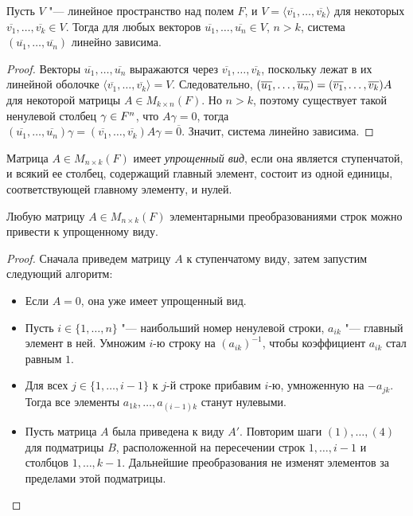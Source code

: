     \begin{theorem}
    	Пусть $V$ "--- линейное пространство над полем $F$, и $V = \langle\overline{v_1}, \dots, \overline{v_k}\rangle$ для некоторых $\overline{v_1}, \dotsc, \overline{v_k} \in V$. Тогда для любых векторов $\overline{u_1}, \dots, \overline{u_n} \in V$, $n > k$, система $(\overline{u_1}, \dots, \overline{u_n})$ линейно зависима.
    \end{theorem}
    
    \begin{proof}
    	Векторы $\overline{u_1}, \dots, \overline{u_n}$ выражаются через $\overline{v_1}, \dots, \overline{v_k}$, поскольку лежат в их линейной оболочке $\langle\overline{v_1}, \dots, \overline{v_k}\rangle = V$. Следовательно, $(\overline{u_1}, \dots, \overline{u_n}) \hm{=} (\overline{v_1}, \dots, \overline{v_k})A$ для некоторой матрицы $A \in M_{k \times n}(F)$. Но $n > k$, поэтому существует такой ненулевой столбец $\gamma \hm{\in} F^n$, что $A\gamma = 0$, тогда $(\overline{u_1}, \dots, \overline{u_n})\gamma = (\overline{v_1}, \dots, \overline{v_k})A\gamma = \overline{0}$. Значит, система линейно зависима.
    \end{proof}
    
    \begin{definition}
    	Матрица $A \in M_{n \times k}(F)$ имеет \textit{упрощенный вид}, если она является ступенчатой, и всякий ее столбец, содержащий главный элемент, состоит из одной единицы, соответствующей главному элементу, и нулей.
    \end{definition}
    
    \begin{theorem}
    	Любую матрицу $A \in M_{n \times k}(F)$ элементарными преобразованиями строк можно привести к упрощенному виду.
    \end{theorem}
    
    \begin{proof}
    	Сначала приведем матрицу $A$ к ступенчатому виду, затем запустим следующий алгоритм:
    	\begin{itemize}
    		\item Если $A = 0$, она уже имеет упрощенный вид.
    		\item Пусть $i \in \{1, \dotsc, n\}$ "--- наибольший номер ненулевой строки, $a_{ik}$ "--- главный элемент в ней. Умножим $i$-ю строку на $(a_{ik})^{-1}$, чтобы коэффициент $a_{ik}$ стал равным $1$.
    		\item Для всех $j \in \{1, \dots, i - 1\}$ к $j$-й строке прибавим $i$-ю, умноженную на $-a_{jk}$. Тогда все элементы $a_{1k}, \dots, a_{(i-1)k}$ станут нулевыми.
    		\item Пусть матрица $A$ была приведена к виду $A'$. Повторим шаги $(1), \dotsc, (4)$ для подматрицы $B$, расположенной на пересечении строк $1, \dotsc, i - 1$ и столбцов $1,\dotsc, k - 1$. Дальнейшие преобразования не изменят элементов за пределами этой подматрицы.\qedhere
    	\end{itemize}
    \end{proof}
    

